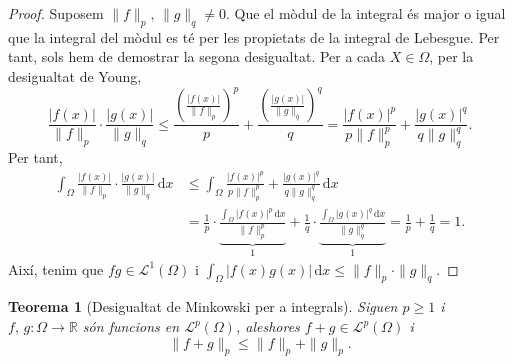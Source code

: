 \documentclass[12pt]{book}
\newtheorem{teorema}{Teorema}[chapter]
\theoremstyle{definition}
\theoremstyle{nota}
\theoremstyle{exemple}
\begin{document}
\begin{proof}
  Suposem $\|f\|_p, \, \|g\|_q \neq 0$. Que el mòdul de la integral és
  major o igual que la integral del mòdul es té per les propietats de
  la integral de Lebesgue. Per tant, sols hem de demostrar la segona
  desigualtat. Per a cada $X \in \Omega$, per la desigualtat de Young,
  \[
    \frac{|f(x)|}{\|f\|_p} \cdot \frac{|g(x)|}{\|g\|_q} \leq
    \frac{\left( \frac{|f(x)|}{\|f\|_p} \right)^p}{p} +
    \frac{\left( \frac{|g(x)|}{\|g\|_q} \right)^q}{q} =
    \frac{|f(x)|^p}{p\|f\|_p^p} + \frac{|g(x)|^q}{q\|g\|_q^q}.
  \]
  Per tant,
  \begin{align*}
    \int_\Omega \frac{|f(x)|}{\|f\|_p} \cdot \frac{|g(x)|}{\|g\|_q}
    \,\mathrm{d}x
    &\leq \int_\Omega \frac{|f(x)|^p}{p\|f\|_p^p} +
      \frac{|g(x)|^q}{q\|g\|_q^q} \,\mathrm{d}x \\
    &=\frac{1}{p} \cdot
      \underbrace{\frac{\int_\Omega|f(x)|^p\,\mathrm{d}x}{\|f\|_p^p}}_1 +
      \frac{1}{q} \cdot
      \underbrace{\frac{\int_\Omega|g(x)|^q\,\mathrm{d}x}{\|g\|_q^q}}_1
      = \frac{1}{p} + \frac{1}{q} = 1.
  \end{align*}
  Així, tenim que $fg \in \mathcal{L}^1(\Omega)$ i 
  \(
    \int_\Omega |f(x)g(x)| \, \mathrm{d}x \leq \|f\|_p \cdot \|g\|_q.
  \)
\end{proof}

\begin{teorema}[Desigualtat de Minkowski per a integrals]
  Siguen $p \geq 1$ i $f,\,g : \Omega \to \mathbb{R}$ són funcions en
  $\mathcal{L}^p(\Omega)$, aleshores $f+g \in \mathcal{L}^p(\Omega)$ i
  \[
    \|f + g\|_p \leq \|f\|_p + \|g\|_p.
  \]
\end{teorema}
\end{document}
